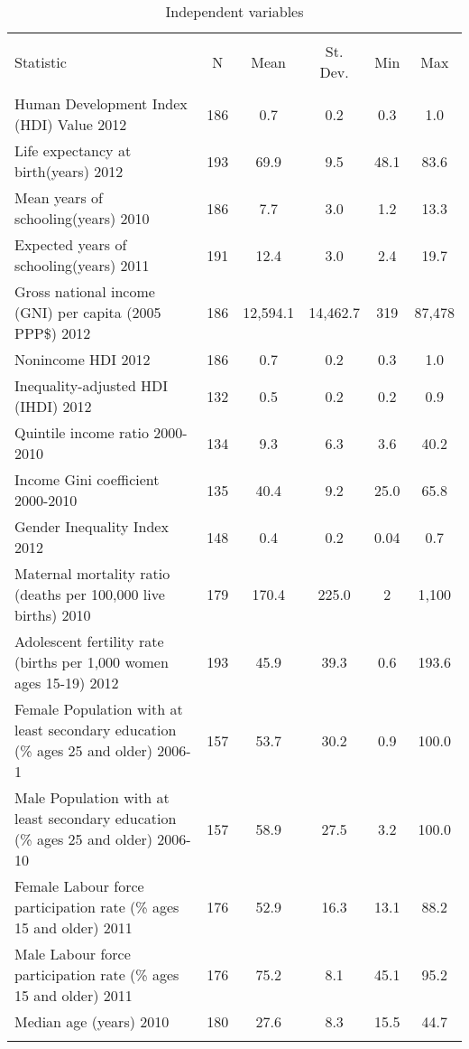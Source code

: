 
\begin{table}[!htbp] \centering 
  \caption{Independent variables} 
  \label{} 
\begin{tabular}{@{\extracolsep{5pt}}p{6cm}ccccc} 
\\[-1.8ex]\hline 
\hline \\[-1.8ex] 
Statistic & \multicolumn{1}{c}{N} & \multicolumn{1}{c}{Mean} & \multicolumn{1}{c}{St. Dev.} & \multicolumn{1}{c}{Min} & \multicolumn{1}{c}{Max} \\ 
\hline \\[-1.8ex] 
Human Development Index (HDI) Value 2012 & 186 & 0.7 & 0.2 & 0.3 & 1.0 \\ 
Life expectancy at birth(years) 2012 & 193 & 69.9 & 9.5 & 48.1 & 83.6 \\ 
Mean years of schooling(years) 2010 & 186 & 7.7 & 3.0 & 1.2 & 13.3 \\ 
Expected years of schooling(years) 2011 & 191 & 12.4 & 3.0 & 2.4 & 19.7 \\ 
Gross national income (GNI) per capita (2005 PPP\$) 2012 & 186 & 12,594.1 & 14,462.7 & 319 & 87,478 \\ 
Nonincome HDI 2012 & 186 & 0.7 & 0.2 & 0.3 & 1.0 \\ 
Inequality-adjusted HDI (IHDI) 2012 & 132 & 0.5 & 0.2 & 0.2 & 0.9 \\ 
Quintile income ratio 2000-2010 & 134 & 9.3 & 6.3 & 3.6 & 40.2 \\ 
Income Gini coefficient 2000-2010 & 135 & 40.4 & 9.2 & 25.0 & 65.8 \\ 
Gender Inequality Index 2012 & 148 & 0.4 & 0.2 & 0.04 & 0.7 \\ 
Maternal mortality ratio (deaths per 100,000 live births) 2010 & 179 & 170.4 & 225.0 & 2 & 1,100 \\ 
Adolescent fertility rate (births per 1,000 women ages 15-19) 2012 & 193 & 45.9 & 39.3 & 0.6 & 193.6 \\ 
Female Population with at least secondary education (\% ages 25 and older) 2006-1 & 157 & 53.7 & 30.2 & 0.9 & 100.0 \\ 
Male Population with at least secondary education (\% ages 25 and older) 2006-10 & 157 & 58.9 & 27.5 & 3.2 & 100.0 \\ 
Female Labour force participation rate (\% ages 15 and older) 2011 & 176 & 52.9 & 16.3 & 13.1 & 88.2 \\ 
Male Labour force participation rate (\% ages 15 and older) 2011 & 176 & 75.2 & 8.1 & 45.1 & 95.2 \\ 
Median age (years) 2010 & 180 & 27.6 & 8.3 & 15.5 & 44.7 \\ 
\hline \\[-1.8ex] 
\end{tabular} 
\end{table} 
